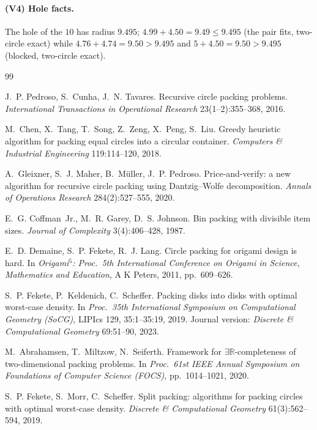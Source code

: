 \documentclass[11pt]{article}
\theoremstyle{definition}
\begin{document}
\paragraph{(V4) Hole facts.} The hole of the $10$ has radius $9.495$;
$4.99+4.50=9.49\le9.495$ (the pair fits, two-circle exact) while
$4.76+4.74=9.50>9.495$ and $5+4.50=9.50>9.495$ (blocked, two-circle exact).

\begin{thebibliography}{99}

J.~P. Pedroso, S.~Cunha, J.~N. Tavares.
Recursive circle packing problems.
\emph{International Transactions in Operational Research} 23(1--2):355--368,
2016.

M.~Chen, X.~Tang, T.~Song, Z.~Zeng, X.~Peng, S.~Liu.
Greedy heuristic algorithm for packing equal circles into a circular
container.
\emph{Computers \& Industrial Engineering} 119:114--120, 2018.

A.~Gleixner, S.~J. Maher, B.~M\"uller, J.~P. Pedroso.
Price-and-verify: a new algorithm for recursive circle packing using
Dantzig--Wolfe decomposition.
\emph{Annals of Operations Research} 284(2):527--555, 2020.

E.~G. Coffman~Jr., M.~R. Garey, D.~S. Johnson.
Bin packing with divisible item sizes.
\emph{Journal of Complexity} 3(4):406--428, 1987.

E.~D. Demaine, S.~P. Fekete, R.~J. Lang.
Circle packing for origami design is hard.
In \emph{Origami$^5$: Proc.\ 5th International Conference on Origami in
Science, Mathematics and Education}, A K Peters, 2011, pp.\ 609--626.

S.~P. Fekete, P.~Keldenich, C.~Scheffer.
Packing disks into disks with optimal worst-case density.
In \emph{Proc.\ 35th International Symposium on Computational Geometry (SoCG)},
LIPIcs 129, 35:1--35:19, 2019. Journal version:
\emph{Discrete \& Computational Geometry} 69:51--90, 2023.

M.~Abrahamsen, T.~Miltzow, N.~Seiferth.
Framework for $\exists\mathbb R$-completeness of two-dimensional packing
problems.
In \emph{Proc.\ 61st IEEE Annual Symposium on Foundations of Computer
Science (FOCS)}, pp.\ 1014--1021, 2020.

S.~P. Fekete, S.~Morr, C.~Scheffer.
Split packing: algorithms for packing circles with optimal worst-case density.
\emph{Discrete \& Computational Geometry} 61(3):562--594, 2019.


\end{thebibliography}
\end{document}
